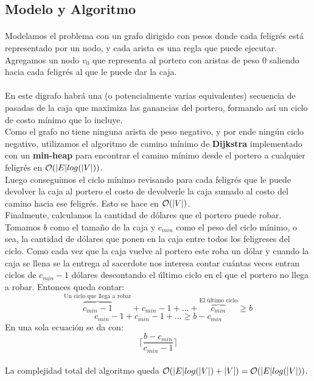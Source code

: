 \documentclass[../main.tex]{subfiles}
\begin{document}
\subsection{Modelo y Algoritmo}
\label{sec:ej3-model}
\paragraph{} Modelamos el problema con un grafo dirigido con pesos donde cada feligrés está representado por un nodo, y cada arista es una regla que puede ejecutar. Agregamos un nodo \(v_{0}\) que representa al portero con aristas de peso 0 saliendo hacia cada feligrés al que le puede dar la caja.

\paragraph{} En este digrafo habr\'a una (o potencialmente varias equivalentes) secuencia de pasadas de la caja que maximiza las ganancias del portero, formando as\'i un ciclo de costo mínimo que lo incluye. \\
Como el grafo no tiene ninguna arista de peso negativo, y por ende ningún ciclo negativo, utilizamos el algoritmo de camino mínimo de \textbf{Dijkstra} implementado con un \textbf{min-heap} para encontrar el camino mínimo desde el portero a cualquier feligrés en \(\mathcal{O}(|E|log(|V|))\). \\
Luego conseguimos el ciclo mínimo revisando para cada feligrés que le puede devolver la caja al portero el costo de devolverle la caja sumado al costo del camino hacia ese feligrés. Esto se hace en \(\mathcal{O}(|V|)\). \\
Finalmente, calculamos la cantidad de dólares que el portero puede robar. Tomamos \(b\) como el tamaño de la caja y \(c_{min}\) como el peso del ciclo mínimo, o sea, la cantidad de dólares que ponen en la caja entre todos los feligreses del ciclo. Como cada vez que la caja vuelve al portero este roba un dólar y cuando la caja se llena se la entrega al sacerdote nos interesa contar cuántas veces entran ciclos de \(c_{min} - 1\) dólares descontando el último ciclo en el que el portero no llega a robar. Entonces queda contar:
\[
    \overbrace{c_{min} - 1}^{\text{Un ciclo que llega a robar}} + c_{min} - 1 + \ldots + \overbrace{c_{min}}^{\text{El último ciclo}} \geq b
\]
\[
    c_{min} - 1 + c_{min} - 1 + \ldots \geq b - c_{min}
\]
En una sola ecuación se da con:
\[
  \Big\lceil\dfrac{b - c_{min}}{c_{min}-1}\Big\rceil
\]

\paragraph{} La complejidad total del algoritmo queda \(\mathcal{O}(|E|log(|V|) + |V|) = \mathcal{O}(|E|log(|V|))\).
\end{document}
